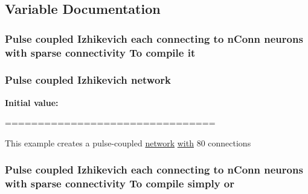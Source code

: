 \subsection{Variable Documentation}
\hypertarget{userproject_2Izh__sparse__project_2README_8txt_a5b3a17f50f267ab4d57ac6b074e618d1}{
\subsubsection[{it}]{\setlength{\rightskip}{0pt plus 5cm}Pulse coupled Izhikevich each connecting {\bf to} n\+Conn {\bf neurons} {\bf with} sparse connectivity To compile it}}\label{userproject_2Izh__sparse__project_2README_8txt_a5b3a17f50f267ab4d57ac6b074e618d1}
\hypertarget{userproject_2Izh__sparse__project_2README_8txt_a3b32176ef4eb1068d5341ffeb475ff7d}{
\subsubsection[{network}]{\setlength{\rightskip}{0pt plus 5cm}Pulse coupled Izhikevich network}}\label{userproject_2Izh__sparse__project_2README_8txt_a3b32176ef4eb1068d5341ffeb475ff7d}
{\bfseries Initial value\+:}
\begin{DoxyCode}
================================

This example creates a pulse-coupled \hyperlink{userproject_2Izh__sparse__project_2README_8txt_a3b32176ef4eb1068d5341ffeb475ff7d}{network} \hyperlink{userproject_2OneComp__project_2README_8txt_ace09bb40fbf4457ad9a9340a67a4fa9a}{with} 80%
connections
\end{DoxyCode}
\hypertarget{userproject_2Izh__sparse__project_2README_8txt_a30f1f0869188bba5db0cb6db428730f1}{
\subsubsection[{or}]{\setlength{\rightskip}{0pt plus 5cm}Pulse coupled Izhikevich each connecting {\bf to} n\+Conn {\bf neurons} {\bf with} sparse connectivity To compile simply or}}\label{userproject_2Izh__sparse__project_2README_8txt_a30f1f0869188bba5db0cb6db428730f1}
